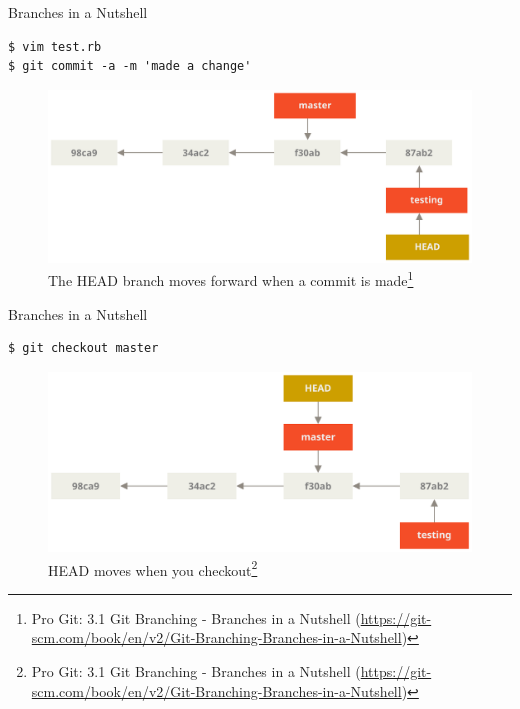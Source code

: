 \documentclass[aspectratio=169]{beamer}
\renewcommand{\footnotesize}{\tiny}
\newcommand{\sectiontitle}{}
\begin{document}
\begin{frame}[fragile]{Branches in a Nutshell}{\sectiontitle}
\begin{verbatim}
$ vim test.rb
$ git commit -a -m 'made a change'
\end{verbatim}
\begin{figure}
    \centering
    \includegraphics[width=\textwidth,height=0.5\textheight,keepaspectratio]{advance-testing}
    \caption{
        The HEAD branch moves forward when a commit is made\footnote{
            Pro Git: 3.1 Git Branching - Branches in a Nutshell
            (\url{https://git-scm.com/book/en/v2/Git-Branching-Branches-in-a-Nutshell})
        }
    }
\end{figure}
\end{frame}

\begin{frame}[fragile]{Branches in a Nutshell}{\sectiontitle}
\begin{verbatim}
$ git checkout master
\end{verbatim}
\begin{figure}
    \centering
    \includegraphics[width=\textwidth,height=0.5\textheight,keepaspectratio]{checkout-master}
    \caption{
        HEAD moves when you checkout\footnote{
            Pro Git: 3.1 Git Branching - Branches in a Nutshell
            (\url{https://git-scm.com/book/en/v2/Git-Branching-Branches-in-a-Nutshell})
        }
    }
\end{figure}
\end{frame}
\end{document}
